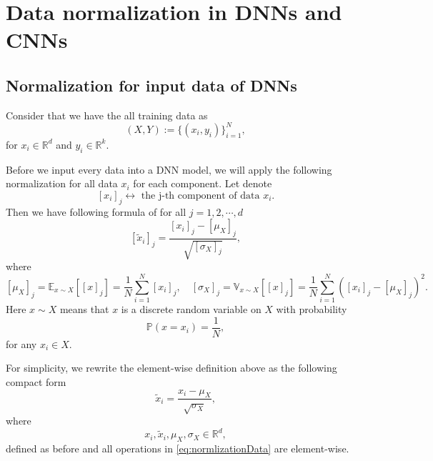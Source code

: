 \section{Data normalization in DNNs and CNNs}

\subsection{Normalization for input data of DNNs}
Consider that we have the all training data as
\begin{equation}\label{eq:trainingdata}
(X,Y) := \{(x_i, y_i)\}_{i=1}^N,
\end{equation}
for $x_i \in \mathbb{R}^d$ and $y_i \in \mathbb{R}^k$.

Before we input every data into a DNN model, we will apply the following normalization
for all data $x_i$ for each component.
Let denote
\begin{equation}\label{key}
[x_i]_j \longleftrightarrow \text{ the j-th component of data } x_i.
\end{equation}
Then we have following formula of for all $j = 1, 2, \cdots, d$
\begin{equation}\label{key}
[\tilde x_i]_j  = \frac{[x_i]_j - [\mu_X]_j }{\sqrt{[\sigma_X]_j}},
\end{equation}
where 
\begin{equation}\label{key}
[\mu_X]_j =\mathbb{E}_{x \sim X}[[x]_j] = \frac{1}{N}\sum_{i=1}^N [x_i]_j, 
\quad  [\sigma_X]_j = \mathbb{V}_{x\sim X}[[x]_j] = \frac{1}{N} \sum_{i=1}^N ( [x_i]_j - [\mu_X]_j)^2.
\end{equation}
Here $x \sim X$ means that $x$ is a discrete random variable on $X$
with probability
\begin{equation}\label{key}
\mathbb P( x = x_i ) = \frac{1}{N},
\end{equation}
for any $x_i \in X$.

For simplicity, we rewrite the element-wise definition above as the following
compact form
\begin{equation}\label{eq:normlizationData}
\tilde x_i = \frac{x_i - \mu_X }{\sqrt{\sigma_X}},
\end{equation}
where
\begin{equation}\label{key}
x_i , \tilde x_i , \mu_X, \sigma_X \in \mathbb{R}^d,
\end{equation}
defined as before and all operations in \eqref{eq:normlizationData} are element-wise.


